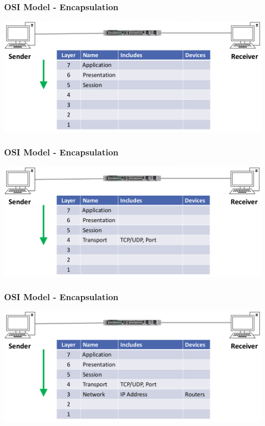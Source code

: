 \documentclass[pdflatex,compress]{beamer}
\begin{document}
\begin{frame}
	\frametitle{OSI Model - Encapsulation}
	\begin{center}
		\includegraphics[width=\linewidth]{img/img05}
	\end{center}
\end{frame}

\begin{frame}
	\frametitle{OSI Model - Encapsulation}
	\begin{center}
		\includegraphics[width=\linewidth]{img/img06}
	\end{center}
\end{frame}

\begin{frame}
	\frametitle{OSI Model - Encapsulation}
	\begin{center}
		\includegraphics[width=\linewidth]{img/img07}
	\end{center}
\end{frame}
\end{document}
